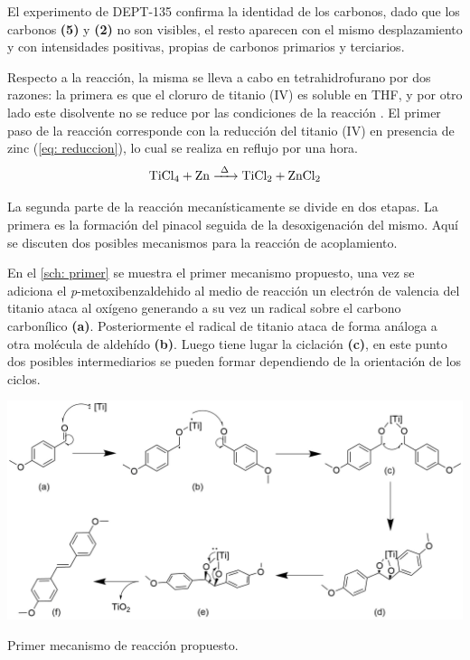 \documentclass[fleqn,11pt]{SelfArx}
\begin{document}
El experimento de DEPT-135 confirma la identidad de los carbonos, dado que los carbonos \textbf{(5)} y \textbf{(2)} no son visibles, el resto aparecen con el mismo desplazamiento y con intensidades positivas, propias de carbonos primarios y terciarios.

Respecto a la reacci\'on, la misma se lleva a cabo en tetrahidrofurano por dos razones: la primera es que el cloruro de titanio (IV) es soluble en THF, y por otro lado este disolvente no se reduce por las condiciones de la reacci\'on \cite{richards2001}. El primer paso de la reacci\'on corresponde con la reducci\'on del titanio (IV) en presencia de zinc (\autoref{eq: reduccion}), lo cual se realiza en reflujo por una hora.
\begin{equation}\label{eq: reduccion}
	\ce{TiCl4 + Zn ->[\Delta] TiCl2 + ZnCl2}
\end{equation}

La segunda parte de la reacci\'on mecan\'isticamente se divide en dos etapas. La primera es la formaci\'on del pinacol seguida de la desoxigenaci\'on del mismo. Aquí se discuten dos posibles mecanismos para la reacci\'on de acoplamiento. 

En el \autoref{sch: primer} se muestra el primer mecanismo propuesto, una vez se adiciona el \textit{p}-metoxibenzaldehido al medio de reacci\'on un electr\'on de valencia del titanio ataca al ox\'igeno generando a su vez un radical sobre el carbono carbon\'ilico \textbf{(a)}. Posteriormente el radical de titanio ataca de forma an\'aloga a otra mol\'ecula de aldeh\'ido \textbf{(b)}. Luego tiene lugar la ciclaci\'on \textbf{(c)}, en este punto dos posibles intermediarios se pueden formar dependiendo de la orientaci\'on de los ciclos.

\begin{scheme}[h]
	\centering
	\includegraphics[width = \linewidth]{structures/mechanism.png}
	\caption{Primer mecanismo de reacci\'on propuesto.}
	\label{sch: primer}
\end{scheme}
\end{document}
